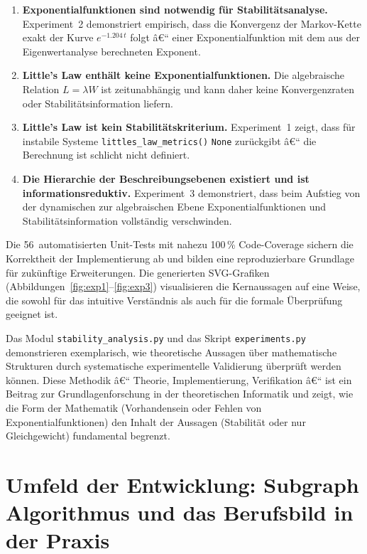 ﻿\documentclass[a4paper,12pt]{report}
\theoremstyle{definition}
\begin{document}
\begin{enumerate}
	\item \textbf{Exponentialfunktionen sind notwendig für
		Stabilitätsanalyse.}  Experiment~2 demonstriert empirisch,
	dass die Konvergenz der Markov-Kette exakt der Kurve
	$e^{-1.204\,t}$ folgt â€“ einer Exponentialfunktion mit dem
	aus der Eigenwertanalyse berechneten Exponent.
	
	\item \textbf{Little's Law enthält keine Exponentialfunktionen.}
	Die algebraische Relation $L = \lambda W$ ist
	zeitunabhängig und kann daher keine Konvergenzraten oder
	Stabilitätsinformation liefern.
	
	\item \textbf{Little's Law ist kein Stabilitätskriterium.}
	Experiment~1 zeigt, dass für instabile Systeme \texttt{littles\_law\_metrics()}
	\texttt{None} zurückgibt â€“ die
	Berechnung ist schlicht nicht definiert.
	
	\item \textbf{Die Hierarchie der Beschreibungsebenen existiert
		und ist informationsreduktiv.}  Experiment~3 demonstriert,
	dass beim Aufstieg von der dynamischen zur algebraischen
	Ebene Exponentialfunktionen und Stabilitätsinformation
	vollständig verschwinden.
\end{enumerate}

Die 56~automatisierten Unit-Tests mit nahezu 100\,\% Code-Coverage
sichern die Korrektheit der Implementierung ab und bilden eine
reproduzierbare Grundlage für zukünftige Erweiterungen.  Die
generierten SVG-Grafiken (Abbildungen~\ref{fig:exp1}--\ref{fig:exp3})
visualisieren die Kernaussagen auf eine Weise, die sowohl für
das intuitive Verständnis als auch für die formale Überprüfung
geeignet ist.

Das Modul \texttt{stability\_analysis.py} und das Skript
\texttt{experiments.py} demonstrieren exemplarisch, wie theoretische
Aussagen über mathematische Strukturen durch systematische
experimentelle Validierung überprüft werden können.  Diese Methodik
â€“ Theorie, Implementierung, Verifikation â€“ ist ein Beitrag zur
Grundlagenforschung in der theoretischen Informatik und zeigt, wie
die Form der Mathematik (Vorhandensein oder Fehlen von
Exponentialfunktionen) den Inhalt der Aussagen (Stabilität oder nur
Gleichgewicht) fundamental begrenzt.

\chapter{Umfeld der Entwicklung: Subgraph Algorithmus und das Berufsbild in der Praxis}
\label{ch:subgraph-praxis}
\label{sec:subgraph}
\end{document}
